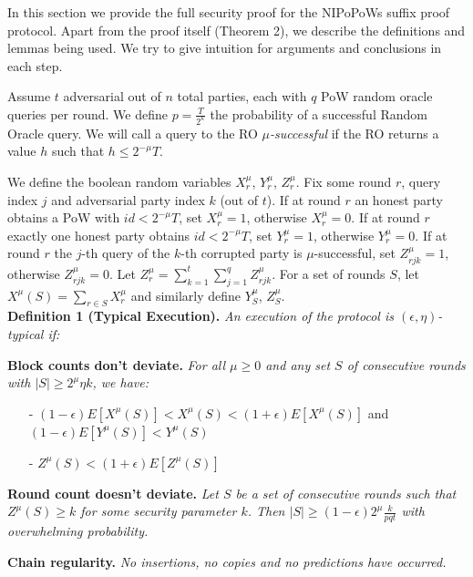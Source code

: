 In this section we provide the full security proof for the NIPoPoWs suffix proof
protocol\cite{NIPoPoWs}. Apart from the proof itself (Theorem 2), we describe the
definitions and lemmas being used. We try to give intuition for arguments and
conclusions in each step.

Assume $t$ adversarial out of $n$ total parties, each with $q$ PoW random oracle
queries per round. We define $p = \frac{T}{2^\kappa}$ the probability of a
successful Random Oracle query. We will call a query to the RO $\mu$\textit{-successful}
if the RO returns a value $h$ such that $h \leq 2^{-\mu}T$.

We define the boolean random variables $X_r^{\mu}$, $Y_r^{\mu}$, $Z_r^{\mu}$.
Fix some round $r$, query index $j$ and adversarial party index $k$ (out of $t$).
If at round $r$ an honest party obtains a PoW with $id < 2^{-\mu}T$, set $X_r^{\mu} = 1$,
otherwise $X_r^{\mu} = 0$. If at round $r$ exactly one honest party obtains
$id < 2^{-\mu}T$, set $Y_r^{\mu} = 1$, otherwise $Y_r^{\mu} = 0$. If at round $
r$ the $j$-th query of the $k$-th corrupted party is $\mu$-successful, set
$Z_{rjk}^{\mu} = 1$, otherwise $Z_{rjk}^{\mu} = 0$. Let $Z_r^{\mu} =
\sum_{k=1}^t\sum_{j=1}^qZ_{rjk}^{\mu}$. For a set of rounds $S$, let
$X^\mu(S) = \sum_{r \in S}X^{\mu}_r$ and similarly define $Y_S^{\mu}$, $Z_S^{\mu}$.\\

\textbf{Definition 1 (Typical Execution).} \textit{An execution of the protocol
is $(\epsilon, \eta)$-typical if:}

\textbf{Block counts don't deviate.} \textit{For all $\mu \geq 0$ and any set
$S$ of consecutive rounds with $\vert S \vert \geq 2^\mu \eta k$, we have:}
\begin{itemize}
\item[-] $(1-\epsilon)E[X^\mu(S)] < X^\mu(S) < (1+\epsilon)E[X^\mu(S)] $ and
$(1-\epsilon)E[Y^\mu(S)] < Y^\mu(S)$
\item[-] $Z^\mu(S) < (1+\epsilon)E[Z^\mu(S)]$
\end{itemize}

\textbf{Round count doesn't deviate.} \textit{Let $S$ be a set of consecutive rounds
such that $Z^\mu(S) \geq k$ for some security parameter $k$. Then $\vert S \vert
\geq (1-\epsilon)2^\mu \frac{k}{pqt}$ with overwhelming probability.}

\textbf{Chain regularity.} \textit{No insertions, no copies and no predictions
\cite{Backbone} have occurred.}\\

